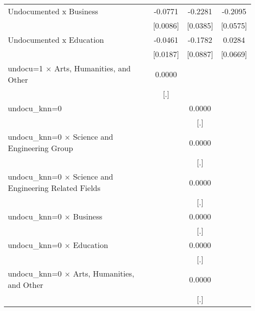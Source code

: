 \begin{table}[htbp]
\begin{tabular}{l*{3}{c}}
\addlinespace
Undocumented x Business&     -0.0771\sym{***}&     -0.2281\sym{***}&     -0.2095\sym{***}\\
                    &    [0.0086]         &    [0.0385]         &    [0.0575]         \\
\addlinespace
Undocumented x Education&     -0.0461\sym{**} &     -0.1782\sym{**} &      0.0284         \\
                    &    [0.0187]         &    [0.0887]         &    [0.0669]         \\
\addlinespace
undocu=1 $\times$ Arts, Humanities, and Other&      0.0000         &                     &                     \\
                    &         [.]         &                     &                     \\
\addlinespace
undocu\_knn=0        &                     &      0.0000         &                     \\
                    &                     &         [.]         &                     \\
\addlinespace
undocu\_knn=0 $\times$ Science and Engineering Group&                     &      0.0000         &                     \\
                    &                     &         [.]         &                     \\
\addlinespace
undocu\_knn=0 $\times$ Science and Engineering Related Fields&                     &      0.0000         &                     \\
                    &                     &         [.]         &                     \\
\addlinespace
undocu\_knn=0 $\times$ Business&                     &      0.0000         &                     \\
                    &                     &         [.]         &                     \\
\addlinespace
undocu\_knn=0 $\times$ Education&                     &      0.0000         &                     \\
                    &                     &         [.]         &                     \\
\addlinespace
undocu\_knn=0 $\times$ Arts, Humanities, and Other&                     &      0.0000         &                     \\
                    &                     &         [.]         &                     \\

\end{tabular}
\end{table}
